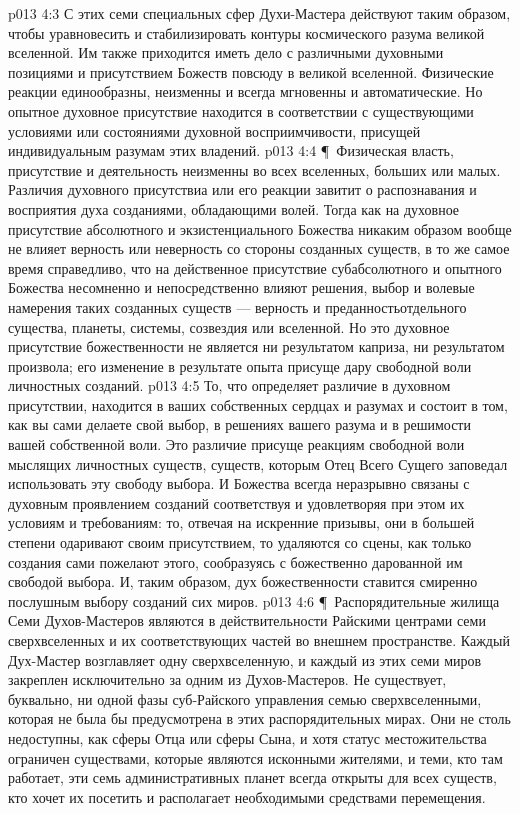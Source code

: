 \vs p013 4:3 С этих семи специальных сфер Духи\hyp{}Мастера действуют таким образом, чтобы уравновесить и стабилизировать контуры космического разума великой вселенной. Им также приходится иметь дело с различными духовными позициями и присутствием Божеств повсюду в великой вселенной. Физические реакции единообразны, неизменны и всегда мгновенны и автоматические. Но опытное духовное присутствие находится в соответствии с существующими условиями или состояниями духовной восприимчивости, присущей индивидуальным разумам этих владений.
\vs p013 4:4 \P\ Физическая власть, присутствие и деятельность неизменны во всех вселенных, больших или малых. Различия духовного присутствиа или его реакции завитит о распознавания и восприятия духа созданиями, обладающими волей. Тогда как на духовное присутствие абсолютного и экзистенциального Божества никаким образом вообще не влияет верность или неверность со стороны созданных существ, в то же самое время справедливо, что на действенное присутствие субабсолютного и опытного Божества несомненно и непосредственно влияют решения, выбор и волевые намерения таких созданных существ --- верность и преданностьотдельного существа, планеты, системы, созвездия или вселенной. Но это духовное присутствие божественности не является ни результатом каприза, ни результатом произвола; его изменение в результате опыта присуще дару свободной воли личностных созданий.
\vs p013 4:5 То, что определяет различие в духовном присутствии, находится в ваших собственных сердцах и разумах и состоит в том, как вы сами делаете свой выбор, в решениях вашего разума и в решимости вашей собственной воли. Это различие присуще реакциям свободной воли мыслящих личностных существ, существ, которым Отец Всего Сущего заповедал использовать эту свободу выбора. И Божества всегда неразрывно связаны с духовным проявлением созданий соответствуя и удовлетворяя при этом их условиям и требованиям: то, отвечая на искренние призывы, они в большей степени одаривают своим присутствием, то удаляются со сцены, как только создания сами пожелают этого, сообразуясь с божественно дарованной им свободой выбора. И, таким образом, дух божественности ставится смиренно послушным выбору созданий сих миров.
\vs p013 4:6 \P\ Распорядительные жилища Семи Духов\hyp{}Мастеров являются в действительности Райскими центрами семи сверхвселенных и их соответствующих частей во внешнем пространстве. Каждый Дух\hyp{}Мастер возглавляет одну сверхвселенную, и каждый из этих семи миров закреплен исключительно за одним из Духов\hyp{}Мастеров. Не существует, буквально, ни одной фазы суб\hyp{}Райского управления семью сверхвселенными, которая не была бы предусмотрена в этих распорядительных мирах. Они не столь недоступны, как сферы Отца или сферы Сына, и хотя статус местожительства ограничен существами, которые являются исконными жителями, и теми, кто там работает, эти семь административных планет всегда открыты для всех существ, кто хочет их посетить и располагает необходимыми средствами перемещения.

